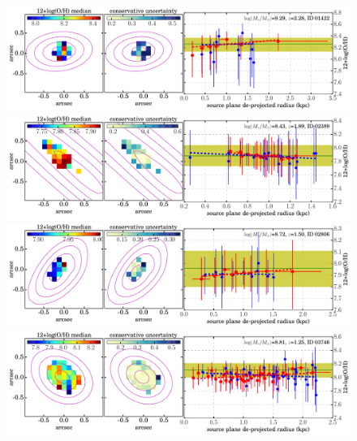 \begin{figure}
    \centering
    \includegraphics[width=\textwidth]{fig_oh12grad/clM1149_id01422.pdf}
    \includegraphics[width=\textwidth]{fig_oh12grad/clM1149_id02389.pdf}
    \includegraphics[width=\textwidth]{fig_oh12grad/clM1149_id02806.pdf}
    \includegraphics[width=\textwidth]{fig_oh12grad/clM1149_id03746.pdf}
\end{figure}

